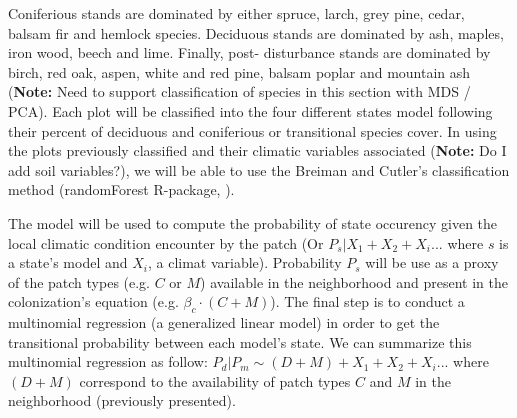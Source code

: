  Coniferious stands are dominated by either
spruce, larch, grey pine, cedar, balsam fir and hemlock species. Deciduous
stands are dominated by ash, maples, iron wood, beech and lime.
 Finally, post-
disturbance stands are dominated by birch, red oak, aspen, white and
red pine, balsam poplar and mountain ash (\textbf{Note:} Need to support
classification of species in this section with MDS / PCA). 
Each plot will be classified into the four different states model following their percent of
deciduous and coniferious or transitional species cover. In using the plots
previously classified and their climatic variables associated (\textbf{Note:}
Do I add soil variables?), we will be able to use the Breiman and Cutler's
classification method (randomForest R-package, \cite{Liaw2002a}). 
%

The model will be used to compute the probability of state occurency given the local climatic
condition encounter by the patch (Or $P_{s}|X_1+X_2+X_i...$ where $s$ is a
state's model and $X_i$, a climat variable). Probability $P_s$ will be use as
a proxy of the patch types (e.g. $C$ or $M$) available in the neighborhood and
present in the colonization's equation (e.g. $\beta_c \cdot (C+M)$). The final
step is to conduct a multinomial regression (a generalized linear model) in
order to get the transitional probability between each model's state. We can
summarize this multinomial regression as follow: $P_{d}|P_{m} \sim (D+M) +
X_1+X_2+X_i... $ where $(D+M)$ correspond to the availability of patch types
$C$ and $M$ in the neighborhood (previously presented).\\


